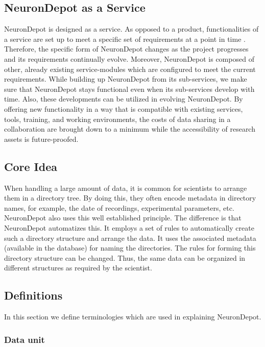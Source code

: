 \documentclass{frontiersSCNS} %
\begin{document}
\subsection{NeuronDepot as a Service}
\label{sec:service}
NeuronDepot is designed as a service. As opposed to
a product, functionalities of a service are set up to meet a
specific set of requirements at a point in time \citep{truex_growing_1999,
bennett_service-based_2000, bullinger_service_2003}. Therefore, the specific
form of NeuronDepot changes as the project progresses and its requirements
continually evolve. Moreover, NeuronDepot is composed of other, already
existing service-modules which are configured to meet the current requirements.
While
building up NeuronDepot from its sub-services, we make sure that NeuronDepot
stays functional even when its sub-services develop with time. Also, these
developments can be utilized in evolving NeuronDepot. By offering new
functionality in a way that is compatible with existing services, tools,
training, and working environments, the costs of data sharing in a
collaboration are brought down to a minimum while the accessibility of research
assets is future-proofed.

\subsection{Core Idea}

When handling a large amount of data, it is common for scientists to arrange
them in a directory tree. By doing this, they often encode metadata in
directory names, for example, the date of recordings, experimental parameters,
etc. NeuronDepot also uses this well established principle. The difference is
that NeuronDepot automatizes this. It employs a set of rules to automatically
create such a directory structure and arrange the data. It uses the associated
metadata (available in the database) for naming the directories. The rules for
forming this directory structure can be changed. Thus, the same data can be
organized in different structures as required by the scientist.

\subsection{Definitions}

In this section we define terminologies which are used in explaining
NeuronDepot.

\subsubsection{Data unit}
\end{document}
